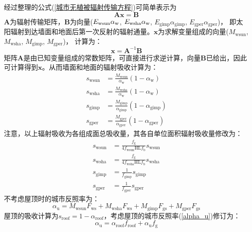 经过整理的公式(\ref{城市无植被辐射传输方程})可简单表示为
\begin{equation}\label{mathbf_AX}
  \mathbf{A x}=\mathbf{B}
\end{equation}
$\mathbf{A}$为辐射传输矩阵，$\mathbf{B}$为向量($E_{\mathrm{wsun}}\alpha_{\rm w}$, $E_{\mathrm{wsha}}\alpha_{\rm w}$, $E_{\mathrm{gimp}}\alpha_{\mathrm{gimp}}$, $E_{\mathrm{gper}}\alpha_{\mathrm{gper}}$)，
即太阳辐射到达墙面和地面后第一次反射的辐射通量。$\mathbf{x}$为求解变量组成的向量(\allowbreak$M_{\mathrm{wsun}}$, \allowbreak$M_{\mathrm{wsha}}$, \allowbreak$M_{\mathrm{gimp}}$, \allowbreak$M_{\mathrm{gper}}$)，
计算为：
\begin{equation}\label{mathbf_X}
  \mathbf{x}=\mathbf{A}^{-1} \mathbf{B}
\end{equation}
矩阵$\mathbf{A}$是由已知变量组成的常数矩阵，可直接进行求逆计算，向量$\mathbf{B}$已给出，因此可计算得到$\mathbf{x}$。从而墙面和地面的辐射吸收计算为：
\begin{equation}\label{s_wsun_wsha_gimp_gper_1}
  \begin{aligned}s_{\mathrm{wsun}} &=\frac{M_{\mathrm{wsun}}}{\alpha_{\mathrm{w}}}\left(1-\alpha_{\mathrm{w}}\right) \\
    s_{\mathrm{wsha}} &=\frac{M_{\mathrm{wsha}}}{\alpha_{\mathrm{w}}}\left(1-\alpha_{\mathrm{w}}\right) \\
    s_{\mathrm{gimp}} &=\frac{M_{\mathrm{gimp}}}{\alpha_{\mathrm{gimp}}}\left(1-\alpha_{\mathrm{gimp}}\right) \\
  s_{\mathrm{gper}} &=\frac{M_{\mathrm{gper}}}{\alpha_{\mathrm{gper}}}\left(1-\alpha_{\mathrm{gper}}\right)\end{aligned}
\end{equation}
注意，以上辐射吸收为各组成面总吸收量，其各自单位面积辐射吸收量修改为：
\begin{equation}\label{s_wsun_wsha_gimp_gper_2}
  \begin{aligned}s_{\mathrm{wsun}} &=\frac{f_{\mathrm{g}}}{4 f_{\mathrm{wsun}} \mathrm{HL} f_{\mathrm{b}}} s_{\mathrm{wsun}} \\
    s_{\mathrm{wsha}} &=\frac{f_{\mathrm{g}}}{4 f_{\mathrm{wsha}} \mathrm{HL} f_{\mathrm{b}}} s_{\mathrm{wsha}} \\
    s_{\mathrm{gimp}} &=\frac{1}{f_{\mathrm{gimp}}} s_{\mathrm{gimp}} \\
  s_{\mathrm{gper}} &=\frac{1}{f_{\mathrm{gper}}} s_{\mathrm{gper}}\end{aligned}
\end{equation}
不考虑屋顶时的城市反照率为：
\begin{equation}\label{alpha_u}
  \alpha_{\mathrm{u}}=M_{\mathrm{wsun}} F_{\mathrm{ws}}+M_{\mathrm{wsha}} F_{\mathrm{ws}}+M_{\mathrm{gimp}} F_{\mathrm{gs}}+M_{\mathrm{gper}} F_{\mathrm{gs}}
\end{equation}
屋顶的吸收计算为$s_{\mathrm{roof}}=1-\alpha_{\mathrm{roof}}$，考虑屋顶的城市反照率(\ref{alpha_u})修订为：
\begin{equation}\label{alpha_u2}
  \alpha_{\mathrm{u}}=\alpha_{\mathrm{{roof }}} f_{\mathrm{roof}}+\alpha_{\mathrm{u}} f_{\mathrm{g}}
\end{equation}

